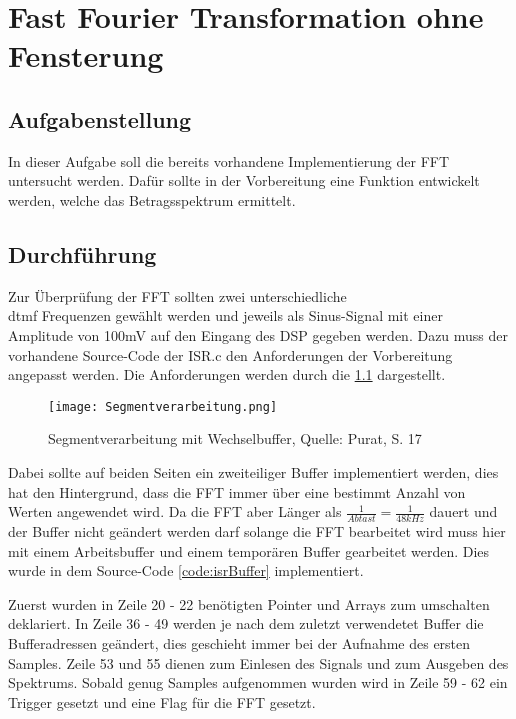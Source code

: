 \chapter{Fast Fourier Transformation ohne Fensterung}\label{CFFToF}
\section{Aufgabenstellung}\label{TFFToF}
In dieser Aufgabe soll die bereits vorhandene Implementierung der FFT untersucht werden. Dafür sollte in der Vorbereitung eine Funktion entwickelt werden, welche das Betragsspektrum ermittelt.

\section{Durchführung}\label{DFFToF}
Zur Überprüfung der FFT sollten zwei unterschiedliche\\ \gls{dtmf} Frequenzen gewählt werden und jeweils als Sinus-Signal mit einer Amplitude von 100mV auf den Eingang des DSP gegeben werden.
Dazu muss der vorhandene Source-Code der ISR.c den Anforderungen der Vorbereitung angepasst werden.
Die Anforderungen werden durch die \cref{fig:BufferRequire} dargestellt.

\begin{figure}[H]
	\texttt{[image: Segmentverarbeitung.png]}
  \caption{Segmentverarbeitung mit Wechselbuffer, Quelle: Purat, S. 17}
  \label{fig:BufferRequire}
\end{figure}

Dabei sollte auf beiden Seiten ein zweiteiliger Buffer implementiert werden, dies hat den Hintergrund, dass die FFT immer über eine bestimmt Anzahl von Werten angewendet wird.
Da die FFT aber Länger als \begin{math}\frac{1}{Abtast} = \frac{1}{48 kHz}\end{math} dauert und der Buffer nicht geändert werden darf solange die FFT bearbeitet wird muss hier mit einem Arbeitsbuffer und einem temporären Buffer gearbeitet werden. Dies wurde in dem Source-Code \autoref{code:isrBuffer} implementiert.
\label{code:isrBuffer}

Zuerst wurden in Zeile 20 - 22 benötigten Pointer und Arrays zum umschalten deklariert.
In Zeile 36 - 49 werden je nach dem zuletzt verwendetet Buffer die Bufferadressen geändert, dies geschieht immer bei der Aufnahme des ersten Samples.
Zeile 53 und 55 dienen zum Einlesen des Signals und zum Ausgeben des Spektrums. Sobald genug Samples aufgenommen wurden wird in Zeile 59 - 62 ein Trigger gesetzt und eine Flag für die FFT gesetzt.

